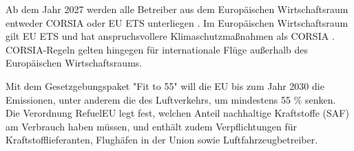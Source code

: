 Ab dem Jahr 2027 werden alle Betreiber aus dem Europäischen Wirtschaftsraum 
entweder CORSIA oder EU ETS unterliegen \cite{uba_aviation_2023}.
Im Europäischen Wirtschaftsraum gilt EU ETS und hat anspruchsvollere 
Klimaschutzmaßnahmen als CORSIA \cite{uba_aviation_2023}.
CORSIA-Regeln gelten hingegen für internationale Flüge außerhalb des Europäischen Wirtschaftsraums.

Mit dem Gesetzgebungspaket "Fit to 55" will die EU bis zum Jahr 2030 die Emissionen, 
unter anderem die des Luftverkehrs, um mindestens 55 \% senken.
Die Verordnung RefuelEU legt fest, welchen Anteil nachhaltige Kraftstoffe (SAF) am Verbrauch haben müssen, 
und enthält zudem Verpflichtungen für Kraftstofflieferanten, Flughäfen in der Union sowie Luftfahrzeugbetreiber.
